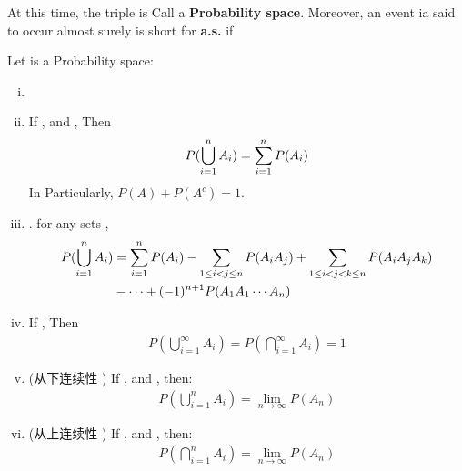 At this time, the triple  is Call a \textbf{Probability space}.
Moreover, an event ia said to occur almost surely is short for \textbf{a.s.} if 


\remark Let  is a Probability space:
\begin{enumerate}[(i)]
    \item {}
    \item If , and , Then
        \begin{align*}
            P(\bigcup_{i=1}^n A_i) = \sum_{i=1}^{n}{P(A_i)} \notag\\ 
        \end{align*}
         {In Particularly}, $P(A) + P(A^c) = 1.$
    \item {}.
        for any sets ,
        \begin{align}
            P(\bigcup_{i=1}^n A_i) & = \sum_{i=1}^{n}{P(A_i)} - \sum_{1\le i<j\le n}{P(A_i A_j)} + \sum_{1\le i < j < k\le n}^{}{P(A_iA_jA_k)}\notag\\
             & - \cdots + (-1)^{n+1}P(A_1A_1\cdots A_n)
        \end{align}
    \item If , Then
        \begin{align*}
            P(\bigcup_{i=1}^\infty A_i) = P(\bigcap_{i=1}^\infty A_i) = 1
        \end{align*}
    \item (从下连续性 \im{\nearrow}) If , and , then:
        \begin{align*}
            P(\bigcup_{i=1}^nA_i) = \lim_{n\to\infty}{P(A_n)}
        \end{align*}
    \item (从上连续性 \im{\searrow}) If , and , then:
        \begin{align*}
            P(\bigcap_{i=1}^nA_i) = \lim_{n\to\infty}{P(A_n)}
        \end{align*}
\end{enumerate}

